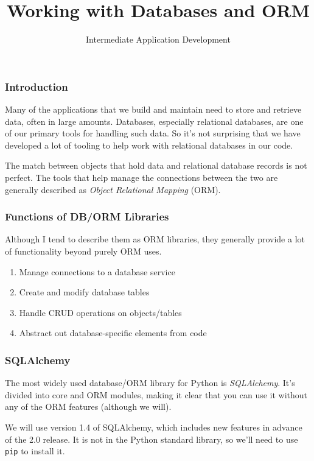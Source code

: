 \documentclass[10pt]{beamer}
\title{Working with Databases and ORM}
\author[IN608]{Intermediate Application Development}
\institute[Otago Polytechnic]{
  Otago Polytechnic \\
  Dunedin, New Zealand \\
  Kaiako: Tom Clark
}
\date{}
\begin{document}
\begin{frame}[plain]
  \titlepage
\end{frame}

\begin{frame}
  \frametitle{Introduction}
  
  Many of the applications that we build and maintain need to store and 
  retrieve data, often in large amounts. Databases, especially relational
  databases, are one of our primary tools for handling such data. So it's 
  not surprising that we have developed a lot of tooling to help work with 
  relational databases in our code.
  
  \vspace{5mm}
  The match between objects that hold data and relational database records
  is not perfect. The tools that help manage the connections between the two
  are generally described as \emph{Object Relational Mapping} (ORM).
  
\end{frame}

\begin{frame}
  \frametitle{Functions of DB/ORM Libraries}

  Although I tend to describe them as ORM libraries, they generally provide
  a lot of functionality beyond purely ORM uses. 
  
  \begin{enumerate}
    \item Manage connections to a database service
    \item Create and modify database tables
    \item Handle CRUD operations on objects/tables
    \item Abstract out database-specific elements from code
  \end{enumerate}  

\end{frame}

\begin{frame}
  \frametitle{SQLAlchemy}

  The most widely used database/ORM library for Python is \emph{SQLAlchemy}.
  It's divided into core and ORM modules, making it clear that you can use it
  without any of the ORM features (although we will). 
  
  \vspace{5mm}
  We will use version 1.4 of SQLAlchemy, which includes new features in advance of 
  the 2.0 release. It is not in the Python standard library, so we'll need to use 
  \texttt{pip} to install it.
 
\end{frame}
\end{document}
